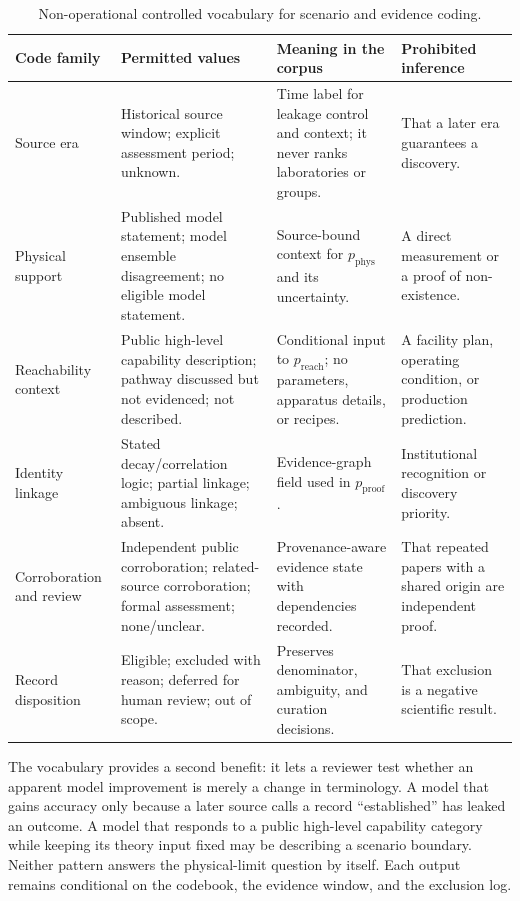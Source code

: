 \documentclass[conference]{IEEEtran}
\begin{document}
\begin{table}[!t]
\caption{Non-operational controlled vocabulary for scenario and evidence coding.}
\label{tab:scenario-vocabulary}
\centering
\renewcommand{\arraystretch}{1.18}
\begin{tabular}{|P{0.17\textwidth}|P{0.25\textwidth}|P{0.29\textwidth}|P{0.17\textwidth}|}
\hline
\textbf{Code family} & \textbf{Permitted values} & \textbf{Meaning in the corpus} & \textbf{Prohibited inference} \\
\hline
Source era & Historical source window; explicit assessment period; unknown. & Time label for leakage control and context; it never ranks laboratories or groups. & That a later era guarantees a discovery. \\
\hline
Physical support & Published model statement; model ensemble disagreement; no eligible model statement. & Source-bound context for $p_{\mathrm{phys}}$ and its uncertainty. & A direct measurement or a proof of non-existence. \\
\hline
Reachability context & Public high-level capability description; pathway discussed but not evidenced; not described. & Conditional input to $p_{\mathrm{reach}}$; no parameters, apparatus details, or recipes. & A facility plan, operating condition, or production prediction. \\
\hline
Identity linkage & Stated decay/correlation logic; partial linkage; ambiguous linkage; absent. & Evidence-graph field used in $p_{\mathrm{proof}}$. & Institutional recognition or discovery priority. \\
\hline
Corroboration and review & Independent public corroboration; related-source corroboration; formal assessment; none/unclear. & Provenance-aware evidence state with dependencies recorded. & That repeated papers with a shared origin are independent proof. \\
\hline
Record disposition & Eligible; excluded with reason; deferred for human review; out of scope. & Preserves denominator, ambiguity, and curation decisions. & That exclusion is a negative scientific result. \\
\hline
\end{tabular}
\end{table}

The vocabulary provides a second benefit: it lets a reviewer test whether an apparent model improvement is merely a change in terminology. A model that gains accuracy only because a later source calls a record ``established'' has leaked an outcome. A model that responds to a public high-level capability category while keeping its theory input fixed may be describing a scenario boundary. Neither pattern answers the physical-limit question by itself. Each output remains conditional on the codebook, the evidence window, and the exclusion log.
\end{document}
